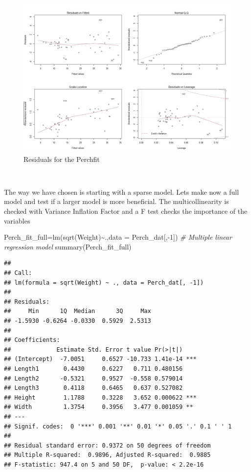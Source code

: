 \documentclass[
]{article}
\newenvironment{Shaded}{\begin{snugshade}}{\end{snugshade}}
\newcommand{\AttributeTok}[1]{\textcolor[rgb]{0.77,0.63,0.00}{#1}}
\newcommand{\CommentTok}[1]{\textcolor[rgb]{0.56,0.35,0.01}{\textit{#1}}}
\newcommand{\DecValTok}[1]{\textcolor[rgb]{0.00,0.00,0.81}{#1}}
\newcommand{\FunctionTok}[1]{\textcolor[rgb]{0.00,0.00,0.00}{#1}}
\newcommand{\NormalTok}[1]{#1}
\newcommand{\OtherTok}[1]{\textcolor[rgb]{0.56,0.35,0.01}{#1}}
\newcommand{\SpecialCharTok}[1]{\textcolor[rgb]{0.00,0.00,0.00}{#1}}
\begin{document}
\begin{figure}

{\centering \includegraphics[width=0.8\linewidth]{Perch_res} 

}

\caption{Residuals for the Perchfit}\label{fig:resid_perch}
\end{figure}

~

The way we have chosen is starting with a sparse model. Lets make now a
full model and test if a larger model is more beneficial. The
multicollinearity is checked with Variance Inflation Factor and a F test
checks the importance of the variables

\begin{Shaded}
\begin{Highlighting}[]
\NormalTok{Perch\_fit\_full}\OtherTok{=}\FunctionTok{lm}\NormalTok{(}\FunctionTok{sqrt}\NormalTok{(Weight)}\SpecialCharTok{\textasciitilde{}}\NormalTok{.,}\AttributeTok{data =}\NormalTok{ Perch\_dat[,}\SpecialCharTok{{-}}\DecValTok{1}\NormalTok{]) }\CommentTok{\#  Multiple linear regression model}
\FunctionTok{summary}\NormalTok{(Perch\_fit\_full)}
\end{Highlighting}
\end{Shaded}

\begin{verbatim}
## 
## Call:
## lm(formula = sqrt(Weight) ~ ., data = Perch_dat[, -1])
## 
## Residuals:
##     Min      1Q  Median      3Q     Max 
## -1.5930 -0.6264 -0.0330  0.5929  2.5313 
## 
## Coefficients:
##             Estimate Std. Error t value Pr(>|t|)    
## (Intercept)  -7.0051     0.6527 -10.733 1.41e-14 ***
## Length1       0.4430     0.6227   0.711 0.480156    
## Length2      -0.5321     0.9527  -0.558 0.579014    
## Length3       0.4118     0.6465   0.637 0.527082    
## Height        1.1788     0.3228   3.652 0.000622 ***
## Width         1.3754     0.3956   3.477 0.001059 ** 
## ---
## Signif. codes:  0 '***' 0.001 '**' 0.01 '*' 0.05 '.' 0.1 ' ' 1
## 
## Residual standard error: 0.9372 on 50 degrees of freedom
## Multiple R-squared:  0.9896, Adjusted R-squared:  0.9885 
## F-statistic: 947.4 on 5 and 50 DF,  p-value: < 2.2e-16
\end{verbatim}
\end{document}
